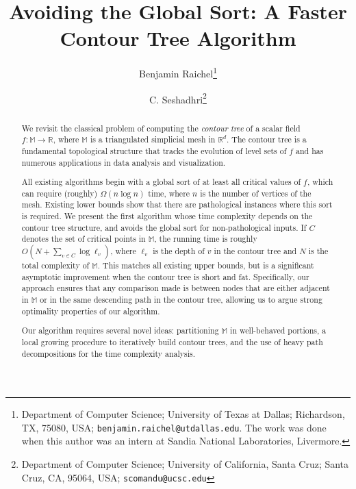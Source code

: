 \documentclass[11pt]{article}
\theoremstyle{definition}
\newcommand{\MM}{\mathbb{M}}
\newcommand{\RR}{\mathbb{R}}
\newcommand{\si}[1]{#1}
\begin{document}
\author{
  Benjamin Raichel\thanks{%
      Department of Computer Science; %
      University of Texas at Dallas; %
      Richardson, TX, 75080, USA; %
      \texttt{\si{benjamin.raichel}@\si{utdallas}.\si{edu}}.
  The work was done when this author was an intern
  at Sandia National Laboratories, Livermore.}
  \and
  C. Seshadhri\thanks{%
        Department of Computer Science; %
      University of California, Santa Cruz; %
      Santa Cruz, CA, 95064, USA; %
      \texttt{\si{scomandu}@\si{ucsc}.\si{edu}} %
  }
}

\title{%
Avoiding the Global Sort: 
\break A Faster Contour Tree Algorithm%
}
\date{}

\maketitle
\thispagestyle{empty}


\begin{abstract}
We revisit the classical problem of computing the \emph{contour tree}
of a scalar field $f:\MM \to \RR$, where $\MM$ is a triangulated simplicial mesh in $\RR^d$. 
The contour tree is a fundamental topological structure that tracks
the evolution of level sets of $f$ and 
has numerous applications in data analysis and visualization.

All existing algorithms begin with a global sort of at least all critical values of $f$,
which can require (roughly) $\Omega(n\log n)$ time, where $n$ is the number of vertices of the mesh.
Existing lower bounds show that there are pathological instances where this sort is required.
We present the first algorithm whose time complexity depends
on the contour tree structure, and avoids the global sort for non-pathological inputs.
If $C$ denotes the set of critical points in $\MM$, the running time is
roughly $O(N+\sum_{v \in C} \log \ell_v)$, where $\ell_v$ is the depth of $v$ in the contour tree and $N$ is the total complexity of $\MM$.
This matches all existing upper bounds, but is a significant asymptotic improvement when the contour tree is short and fat.
Specifically, our approach ensures that any comparison made is between nodes that are either adjacent in $\MM$ 
or in the same descending path in the contour tree,
allowing us to argue strong optimality properties of our algorithm.

Our algorithm requires several novel ideas: partitioning $\MM$ in well-behaved portions, 
a local growing procedure to iteratively build contour trees, and the use of heavy path 
decompositions for the time complexity analysis. 
\end{abstract}
\end{document}

